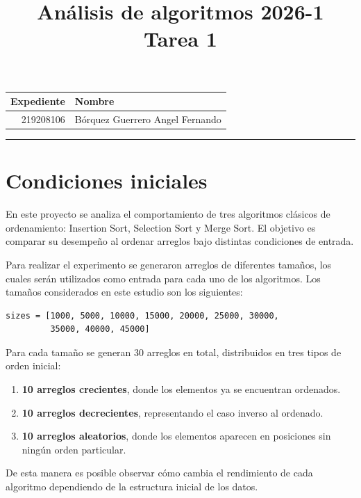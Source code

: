\documentclass[a4paper, 11pt]{article}
\title
{
    Análisis de algoritmos 2026-1 \\
    Tarea 1
}
\begin{document}
    \maketitle

    \begin{center}
        \begin{tabular}{r|l}
            \textbf{Expediente} & \textbf{Nombre} \\ \hline
            219208106 & Bórquez Guerrero Angel Fernando \\
        \end{tabular}
    \end{center}

    \rule{\linewidth}{0.3mm}

    \vspace{0.3cm}
    \section{Condiciones iniciales}
    En este proyecto se analiza el comportamiento de tres algoritmos clásicos de ordenamiento: Insertion Sort, Selection Sort y Merge Sort. El objetivo es comparar su desempeño al ordenar arreglos bajo distintas condiciones de entrada. \par

    Para realizar el experimento se generaron arreglos de diferentes tamaños, los cuales serán utilizados como entrada para cada uno de los algoritmos. Los tamaños considerados en este estudio son los siguientes: \\
\begin{lstlisting}
sizes = [1000, 5000, 10000, 15000, 20000, 25000, 30000, 
         35000, 40000, 45000]
\end{lstlisting}

Para cada tamaño se generan 30 arreglos en total, distribuidos en tres tipos de orden inicial:
\begin{enumerate}
    \item \textbf{10 arreglos crecientes}, donde los elementos ya se encuentran ordenados.
    \item \textbf{10 arreglos decrecientes}, representando el caso inverso al ordenado.
    \item \textbf{10 arreglos aleatorios}, donde los elementos aparecen en posiciones sin ningún orden particular.
\end{enumerate}
De esta manera es posible observar cómo cambia el rendimiento de cada algoritmo dependiendo de la estructura inicial de los datos. \par
\end{document}

